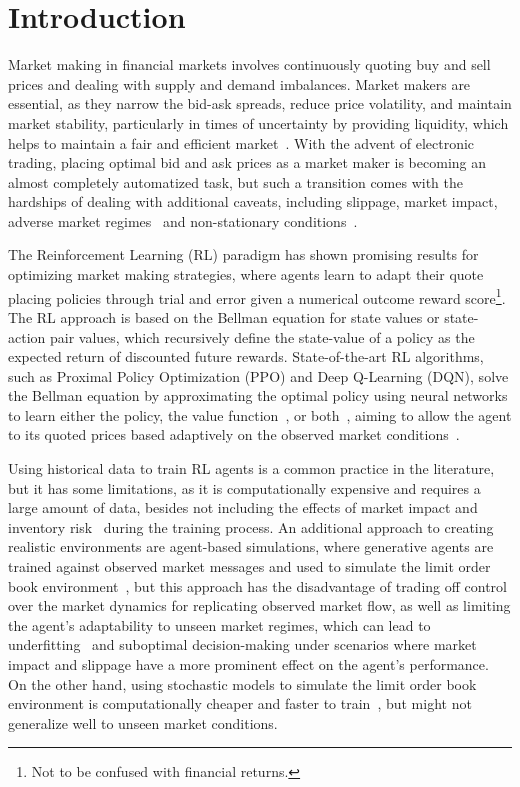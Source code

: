 \section{Introduction}
\label{sec:introduction}

Market making in financial markets involves continuously quoting buy and sell prices and dealing with supply and demand imbalances.
Market makers are essential, as they narrow the bid-ask spreads, reduce price volatility, and maintain market stability,
particularly in times of uncertainty by providing liquidity, which helps to maintain a fair and efficient market~\cite{Glosten1985, OHara1995}.
With the advent of electronic trading, placing optimal bid and ask prices as a market maker is becoming an almost completely automatized task,
but such a transition comes with the hardships of dealing with additional caveats, including slippage, market impact, adverse market regimes~\cite{Cont2010, Bouchaud2018}
and non-stationary conditions~\cite{Gasperov2021}.

The Reinforcement Learning (RL) paradigm has shown promising results for optimizing market making strategies,
where agents learn to adapt their quote placing policies through trial and error given a numerical outcome reward score\footnote{Not to be confused with financial returns.}.
The RL approach is based on the Bellman equation for state values or state-action pair values,
which recursively define the state-value of a policy as the expected return of discounted future rewards.
State-of-the-art RL algorithms, such as Proximal Policy Optimization (PPO) and Deep Q-Learning (DQN),
solve the Bellman equation by approximating the optimal policy using neural networks to learn either the policy, the value function~\cite{Sutton2018},
or both~\cite{Schulman2015, Mnih2015}, aiming to allow the agent to its quoted prices based adaptively on the observed market conditions~\cite{He2023, Bakshaev2020}.

Using historical data to train RL agents is a common practice in the literature, but it has some limitations,
as it is computationally expensive and requires a large amount of data,
besides not including the effects of market impact and inventory risk~\cite{Frey2023, Ganesh2019} during the training process.
An additional approach to creating realistic environments are agent-based simulations,
where generative agents are trained against observed market messages and used to simulate the limit order book environment~\cite{Frey2023, Ganesh2019},
but this approach has the disadvantage of trading off control over the market dynamics for replicating observed market flow,
as well as limiting the agent's adaptability to unseen market regimes, which can lead to underfitting~\cite{Jerome2022, Selser2021}
and suboptimal decision-making under scenarios where market impact and slippage have a more prominent effect on the agent's performance.
On the other hand, using stochastic models to simulate the limit order book environment is computationally cheaper and faster to train~\cite{Gasperov2021, Sun2022},
but might not generalize well to unseen market conditions.

